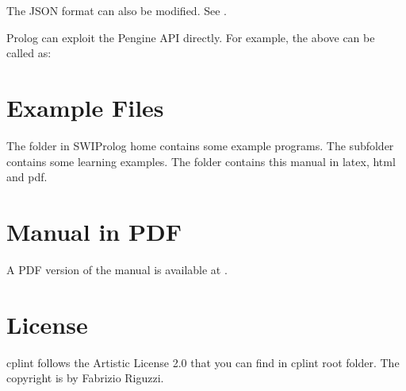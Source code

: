 \documentclass[letterpaper,10pt,english]{sphinxmanual}
\begin{document}
\sphinxAtStartPar
The JSON format can also be modified.
See .

\sphinxAtStartPar
Prolog can exploit the Pengine API directly. For example, the above can be called as:

\begin{sphinxVerbatim}[commandchars=\\\{\}]
 \PYG{p}{[}\PYG{p}{]}
 
        \PYG{p}{[} 
\PYG{p}{]}

  
\end{sphinxVerbatim}


\chapter{Example Files}
\label{\detokenize{index:example-files}}
\sphinxAtStartPar
The  folder in SWI\sphinxhyphen{}Prolog home contains some example programs.
The subfolder  contains some learning examples.
The  folder contains this manual in latex, html and pdf.


\chapter{Manual in PDF}
\label{\detokenize{index:manual-in-pdf}}
\sphinxAtStartPar
A PDF version of the manual is available at .


\chapter{License}
\label{\detokenize{index:license}}
\sphinxAtStartPar
cplint follows the Artistic License 2.0 that you can find in cplint root folder.
The copyright is by Fabrizio Riguzzi.
\end{document}
